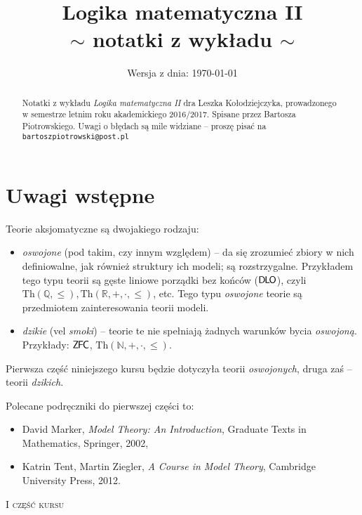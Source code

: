 \documentclass{article}
\title{\textbf{Logika matematyczna II} \\ \Large{$\sim$ notatki z wykładu $\sim$}}
\date{\small{Wersja z dnia: \today}}
\newcommand{\N}{\mathbb{N}}
\newcommand{\Q}{\mathbb{Q}}
\newcommand{\R}{\mathbb{R}}
\theoremstyle{plain}
\theoremstyle{definition}
\theoremstyle{remark}
\newcommand{\ZFC}{\mathsf{Z \mkern-1.6mu F \mkern-1.5mu C}}
\newcommand{\DLO}{\mathsf{D \mkern-1.5mu L \mkern-1.8mu O}}
\newcommand{\Th}{\text{Th}}
\begin{document}
\maketitle

\begin{abstract}
	Notatki z wykładu \textit{Logika matematyczna II} dra Leszka
	Kołodziejczyka, prowadzonego w semestrze letnim roku akademickiego
	2016/2017. Spisane przez Bartosza Piotrowskiego. Uwagi o błędach są
	mile widziane -- proszę pisać na \texttt{bartoszpiotrowski@post.pl}
\end{abstract}


\section*{Uwagi wstępne}
Teorie aksjomatyczne są dwojakiego rodzaju:
\begin{itemize} %
	\item \textit{oswojone} (pod takim, czy innym względem) -- da się
		zrozumieć zbiory w nich definiowalne, jak również struktury ich
		modeli; są rozstrzygalne. Przykładem tego typu teorii są gęste
		liniowe porządki bez końców ($\DLO$), czyli $\Th(\Q, \leq),
		\Th(\R, +, \cdot, \leq)$, etc. Tego typu \textit{oswojone}
		teorie są przedmiotem zainteresowania teorii modeli.
	\item \textit{dzikie} (vel \textit{smoki}) -- teorie te nie spełniają
		żadnych warunków bycia \textit{oswojoną}. Przykłady: $\ZFC$,
		$\Th(\N, +, \cdot, \leq)$.
\end{itemize}
Pierwsza część niniejszego kursu będzie dotyczyła teorii \textit{oswojonych},
druga zaś -- teorii \textit{dzikich}.

Polecane podręczniki do pierwszej części to:
\begin{itemize}
	\item David Marker, \textit{Model Theory: An Introduction}, Graduate
		Texts in Mathematics, Springer, 2002,
	\item Katrin Tent, Martin Ziegler, \textit{A Course in Model Theory},
		Cambridge University Press, 2012.
\end{itemize}

\newpage
\begin{center}
{\Large \textsc{I część kursu}}
\end{center}
\vspace{-0.4cm}
\end{document}
